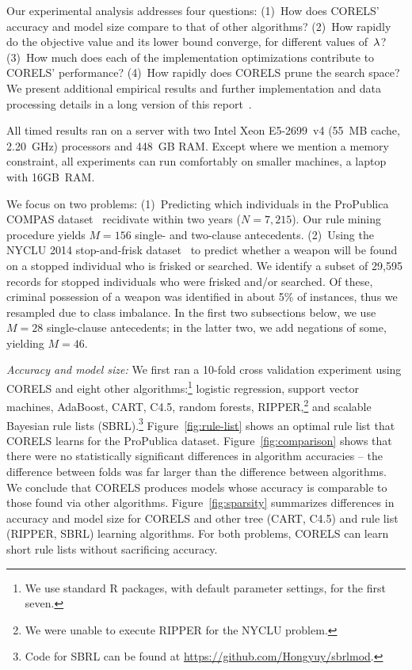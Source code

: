 
Our experimental analysis addresses four questions:
(1)~How does CORELS' accuracy and model size compare to that of other algorithms?
(2)~How rapidly do the objective value and its lower bound converge, for different values of~${\lambda}$?
(3)~How much does each of the implementation optimizations contribute to CORELS' performance?
(4)~How rapidly does CORELS prune the search space?
We present additional empirical results and further implementation and data processing details
in a long version of this report~\citep{AngelinoLaAlSeRu17}.

All timed results ran on a server with two Intel Xeon E5-2699~v4
(55~MB cache, 2.20~GHz) processors and 448~GB RAM.
%
Except where we mention a memory constraint, all experiments
can run comfortably on smaller machines, \eg a laptop with 16GB~RAM.

We focus on two problems:
(1)~Predicting which individuals in the ProPublica COMPAS dataset~\citep{LarsonMaKiAn16}
recidivate within two years (${N = 7,215}$).
Our rule mining procedure yields ${M = 156}$ single- and two-clause antecedents.
%
(2)~Using the NYCLU 2014 stop-and-frisk dataset~\citep{nyclu:2014}
to predict whether a weapon will be found on a stopped individual who is frisked or searched.
We identify a subset of 29,595 records for stopped individuals who were frisked and/or searched.
Of these, criminal possession of a weapon was identified in about 5\% of instances,
thus we resampled due to class imbalance.
In the first two subsections below, we use ${M =28}$ single-clause antecedents;
in the latter two, we add negations of some, yielding ${M =46}$.

\textit{Accuracy and model size:}
We first ran a 10-fold cross validation experiment using CORELS
and eight other algorithms:\footnote{We use standard R packages, with default
parameter settings, for the first seven.}
logistic regression, support vector machines, AdaBoost, CART, C4.5, random forests,
RIPPER,\footnote{We were unable to execute RIPPER for the NYCLU problem.}
and scalable Bayesian rule lists (SBRL).\footnote{Code for SBRL can be found at
\url{https://github.com/Hongyuy/sbrlmod}.}
%
Figure~\ref{fig:rule-list} shows an  optimal rule list that CORELS learns
for the ProPublica dataset.
%
Figure~\ref{fig:comparison} shows that there were no statistically significant
differences in algorithm accuracies --
the difference between folds was far larger than the difference between algorithms.
%
We conclude that CORELS produces models whose accuracy is comparable to those found via other algorithms.
%
Figure~\ref{fig:sparsity} summarizes differences in accuracy and model size
for CORELS and other tree (CART, C4.5) and rule list (RIPPER, SBRL) learning algorithms.
%
For both problems, CORELS can learn short rule lists without sacrificing accuracy.

